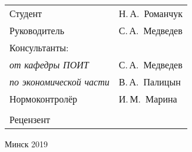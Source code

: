 \begin{titlepage}
\begin{center}
    \begin{tabular}{ p{}p{} }
      Студент & Н.\,А.~Романчук \\
      Руководитель & С.\,А.~Медведев \\
      Консультанты: &\\
      \hspace*{3ex}\emph{от кафедры ПОИТ} & С.\,А.~Медведев \\
      \hspace*{3ex}\emph{по экономической части} & В.\,А.~Палицын \\
      Нормоконтролёр & И.\,М.~Марина\\
      & \\
      Рецензент &
    \end{tabular}
    
    \vfill
    {\normalsize Минск 2019}
  \end{center}
\end{titlepage}
